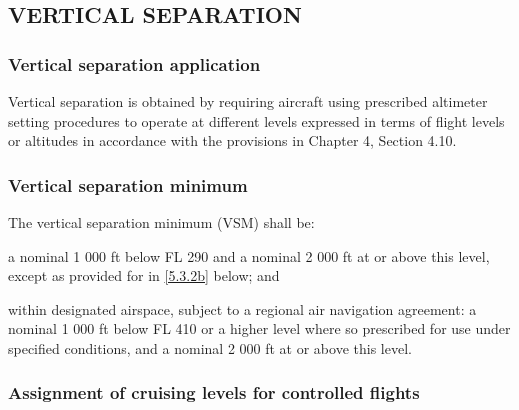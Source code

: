 \subsection[Vertical separation]{VERTICAL SEPARATION}

\subsubsection{Vertical separation application}

Vertical separation is obtained by requiring aircraft using prescribed altimeter setting procedures to operate at different levels expressed in terms of flight levels or altitudes in accordance with the provisions in Chapter 4, Section 4.10.

\subsubsection{Vertical separation minimum}

The vertical separation minimum (VSM) shall be:

\begin{enumalph}
    \item a nominal 1 000 ft below FL 290 and a nominal 2 000 ft at or above this level, except as provided for in \ref{5.3.2b} below; and
    \item \label{5.3.2b} within designated airspace, subject to a regional air navigation agreement: a nominal 1 000 ft below FL 410 or a higher level where so prescribed for use under specified conditions, and a nominal 2 000 ft at or above this level.
\end{enumalph}


\subsubsection{Assignment of cruising levels for controlled flights}

